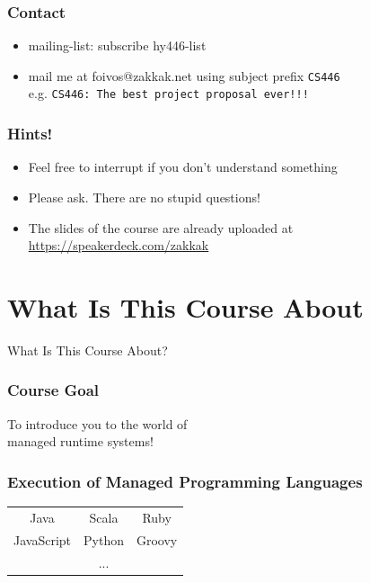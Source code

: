 \documentclass[
14pt,
aspectratio=169,
usenames,
dvipsnames,
x11names]{beamer}
\begin{document}
\begin{frame}
  \frametitle{Contact}
  \begin{itemize} \setlength{\itemsep}{\fill}
  \item mailing-list: \alert{subscribe hy446-list}
  \item mail me at \alert{foivos@zakkak.net} using subject prefix \texttt{CS446} \\
    e.g. \texttt{CS446: The best project proposal ever!!!}
  \end{itemize}
\end{frame}

\begin{frame}
  \frametitle{Hints!}
  \begin{itemize} \setlength{\itemsep}{\fill}
  \item Feel free to \alert{interrupt} if you don't understand something
  \item Please ask. \alert{There are no stupid questions}!
  \item The slides of the course are already uploaded at \url{https://speakerdeck.com/zakkak}
  \end{itemize}
\end{frame}

\section{What Is This Course About}

\begin{frame}
  \centering
  \Large
  What Is This Course About?
\end{frame}

\begin{frame}
  \frametitle{Course Goal}
  \centering
  To introduce you to the world of\\
  managed runtime systems!
\end{frame}

\begin{frame}
  \frametitle{Execution of Managed Programming Languages}
  \centering
  \def\arraystretch{2}
  \setlength\tabcolsep{2em}
  \begin{tabular}{c c c}
    Java       & Scala  & Ruby   \\
    JavaScript & Python & Groovy \\
               & ...    &        \\
  \end{tabular}
\end{frame}
\end{document}
